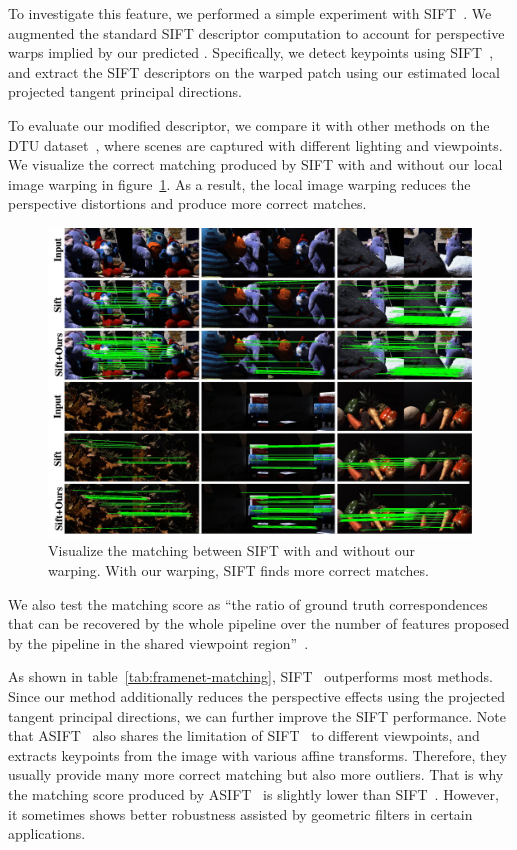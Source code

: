 To investigate this feature, we performed a simple experiment with SIFT~\cite{lowe2004distinctive}.  We augmented the standard SIFT descriptor computation to account for perspective warps implied by our predicted \cframes. Specifically, we detect keypoints using SIFT~\cite{lowe2004distinctive}, and extract the SIFT descriptors on the warped patch using our estimated local projected tangent principal directions.

To evaluate our modified descriptor, we compare it with other methods on the DTU dataset~\cite{aanaes2012interesting}, where scenes are captured with different lighting and viewpoints. We visualize the correct matching produced by SIFT with and without our local image warping in figure~\ref{fig:framenet-dtu-vis}. As a result, the local image warping reduces the perspective distortions and produce more correct matches.
\begin{figure}
    \centering
    \includegraphics[width=0.8\linewidth]{FrameNet/graph/vis-sift.pdf}
    \caption{Visualize the matching between SIFT with and without our warping. With our warping, SIFT finds more correct matches.}
    \label{fig:framenet-dtu-vis}
\end{figure}
We also test the matching score as ``the ratio of ground truth correspondences that can be recovered by the whole pipeline over the number of features proposed by the pipeline in the shared viewpoint region''~\cite{yi2016lift}.

As shown in table~\ref{tab:framenet-matching}, SIFT~\cite{lowe2004distinctive} outperforms most methods. Since our method additionally reduces the perspective effects using the projected tangent principal directions, we can further improve the SIFT performance. Note that ASIFT~\cite{yu2011asift} also shares the limitation of SIFT~\cite{lowe2004distinctive} to different viewpoints, and extracts keypoints from the image with various affine transforms. Therefore, they usually provide many more correct matching but also more outliers. That is why the matching score produced by ASIFT~\cite{yu2011asift} is slightly lower than SIFT~\cite{lowe2004distinctive}. However, it sometimes shows better robustness assisted by geometric filters in certain applications.


